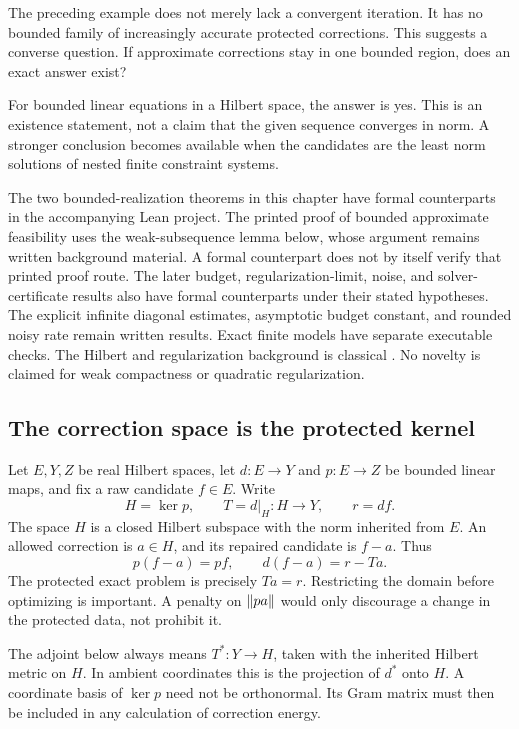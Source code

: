 \clearpage
{}\label{sec:bounded-realization}
The preceding example does not merely lack a convergent iteration. It has no bounded family of increasingly accurate protected corrections. This suggests a converse question. If approximate corrections stay in one bounded region, does an exact answer exist?

For bounded linear equations in a Hilbert space, the answer is yes. This is an existence statement, not a claim that the given sequence converges in norm. A stronger conclusion becomes available when the candidates are the least norm solutions of nested finite constraint systems.

\begin{scopebox}
The two bounded-realization theorems in this chapter have formal counterparts in the accompanying Lean project. The printed proof of bounded approximate feasibility uses the weak-subsequence lemma below, whose argument remains written background material. A formal counterpart does not by itself verify that printed proof route. The later budget, regularization-limit, noise, and solver-certificate results also have formal counterparts under their stated hypotheses. The explicit infinite diagonal estimates, asymptotic budget constant, and rounded noisy rate remain written results. Exact finite models have separate executable checks. The Hilbert and regularization background is classical \cite{clason-inverse}. No novelty is claimed for weak compactness or quadratic regularization.
\end{scopebox}

\subsection{The correction space is the protected kernel}
Let $E,Y,Z$ be real Hilbert spaces, let $d:E\to Y$ and $p:E\to Z$ be bounded linear maps, and fix a raw candidate $f\in E$. Write
\[
 H=\ker p,\qquad T=d|_H:H\to Y,\qquad r=df.
\]
The space $H$ is a closed Hilbert subspace with the norm inherited from $E$. An allowed correction is $a\in H$, and its repaired candidate is $f-a$. Thus
\[
 p(f-a)=pf,\qquad d(f-a)=r-Ta.
\]
The protected exact problem is precisely $Ta=r$. Restricting the domain before optimizing is important. A penalty on $\left\lVert pa\right\rVert$ would only discourage a change in the protected data, not prohibit it.

The adjoint below always means $T^*:Y\to H$, taken with the inherited Hilbert metric on $H$. In ambient coordinates this is the projection of $d^*$ onto $H$. A coordinate basis of $\ker p$ need not be orthonormal. Its Gram matrix must then be included in any calculation of correction energy.

